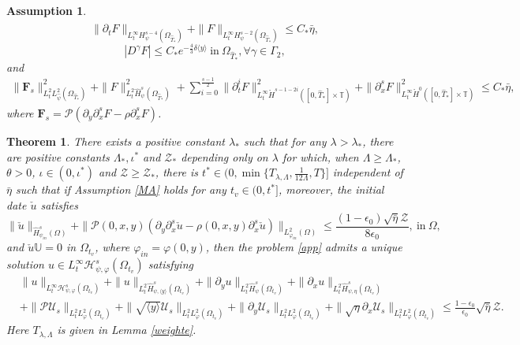 \documentclass[10pt,a4paper]{amsart}
\newtheorem{assumption}{Assumption}
\newtheorem{theorem}{Theorem}
\newcommand\y{{{\langle y \rangle}}}
\begin{document}
\begin{assumption}
\begin{align*}
\end{align*}
$$
\|\partial_{t}F\|_{L_{t}^{\infty}H_{\psi}^{s-4}(\Omega_{\hat{T}_{*}})}+\|F\|_{L_{t}^{\infty}H_{\psi}^{s-2}(\Omega_{\hat{T}_{*}})}
\leq C_{*}\bar{\eta},
$$
$$
|D^{\gamma}F|\leq C_{*}e^{-\frac{4}{3}\delta\y}~\text{in}~\Omega_{\hat{T}_{*}}, \forall \gamma\in\Gamma_{2},
$$
and
\begin{align*}
\|\mathbf{F}_{s}\|_{L_{t}^{2}L_{\hat{\psi}}^{2}(\Omega_{\hat{T}_{*}})}^{2}
+\|F\|_{L_{t}^{2}\hat{H}_{\psi}^{s}(\Omega_{\hat{T}_{*}})}^{2}
+\sum_{i=0}^{\frac{s-1}{2}}\|\partial_{t}^{i}F\|_{L_{t}^{\infty}\mathring{H}^{s-1-2i}([0,\hat{T}_{*}]\times\mathbb{T})}^{2}
+\|\partial_{x}^{s}F\|_{L_{t}^{\infty}\mathring{H}^{0}([0,\hat{T}_{*}]\times\mathbb{T})}^{2}
\leq C_{*}\bar{\eta},
\end{align*}
where $\mathbf{F}_{s}=\mathcal{P}\left(\partial_{y}\partial_{x}^{s}F-\rho \partial_{x}^{s}F\right)$.
\end{assumption}

\begin{theorem}\label{wpae}
There exists a positive constant $\lambda_{*}$ such that for any $\lambda>\lambda_{*}$, there are positive constants $\Lambda_{*}, \iota^{*}$ and $\mathcal{Z}_{*}$ depending only on $\lambda$ for which, when $\Lambda\geq\Lambda_{*}$, $\theta>0$, $\iota\in(0,\iota^{*})$ and $\mathcal{Z}\geq\mathcal{Z}_{*}$, there is $t^{*}\in(0,\min\{T_{\lambda,\Lambda},\frac{1}{12\Lambda},T\}]$ independent of $\bar{\eta}$ such that if Assumption \ref{MA} holds for any $t_{v}\in(0,t^{*}]$, moreover, the initial date $\check{u}$ satisfies
$$\|\check{u}\|_{\hat{H}_{\psi_{in}}^{s}(\Omega)}
 +\|\mathcal{P}(0,x,y)(\partial_{y}\partial_{x}^{s}\check{u}-\rho(0,x,y)\partial_{x}^{s}\check{u})\|_{L_{\varphi_{in}}^{2}(\Omega)}
\leq \frac{(1-\epsilon_{0})\sqrt{\bar{\eta}}\mathcal{Z}}{8\epsilon_{0}},~\text{in}~\Omega,$$
and $\check{u}\mathbb{U}=0$ in $\Omega_{t_{v}}$, where $\varphi_{in}=\varphi(0,y)$, then the problem \eqref{app} admits a unique solution
$u\in L_{t}^{\infty}\mathcal{H}_{\psi,\varphi}^{s}(\Omega_{t_{v}})$ satisfying
\begin{align}\label{priore}
& \|u\|_{L_{t}^{\infty}\mathcal{H}_{\psi,\varphi}^{s}(\Omega_{t_{v}})}
 +\|u\|_{L_{t}^{2}\hat{H}_{\psi,\y}^{s}(\Omega_{t_{v}})}
 +\|\partial_{y}u\|_{L_{t}^{2}\hat{H}_{\psi}^{s}(\Omega_{t_{v}})}
 +\|\partial_{x}u\|_{L_{t}^{2}\hat{H}_{\psi,\eta}^{s}(\Omega_{t_{v}})}\\
&+\|\mathcal{P}\mathcal{U}_{s}\|_{L_{t}^{2}L_{\varphi}^{2}(\Omega_{t_{v}})}
 +\|\sqrt{\y}\mathcal{U}_{s}\|_{L_{t}^{2}L_{\varphi}^{2}(\Omega_{t_{v}})}
 +\|\partial_{y}\mathcal{U}_{s}\|_{L_{t}^{2}L_{\varphi}^{2}(\Omega_{t_{v}})}
 +\|\sqrt{\eta}\partial_{x}\mathcal{U}_{s}\|_{L_{t}^{2}L_{\varphi}^{2}(\Omega_{t_{v}})}
\leq \frac{1-\epsilon_{0}}{\epsilon_{0}}\sqrt{\bar{\eta}}\mathcal{Z}.\nonumber
\end{align}
Here $T_{\lambda,\Lambda}$ is given in Lemma \ref{weighte}.
\end{theorem}
\end{document}
